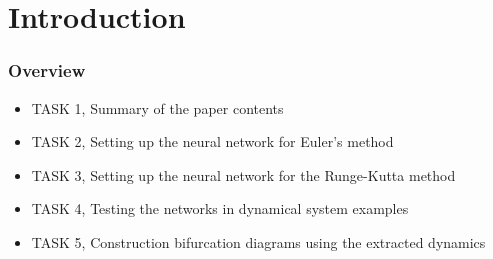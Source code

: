 \section{Introduction}

\begin{frame}
	\frametitle{Overview}
	\begin{itemize}
		\item TASK 1, Summary of the paper contents
		\item TASK 2, Setting up the neural network for Euler's method
		\item TASK 3, Setting up the neural network for the Runge-Kutta method
		\item TASK 4, Testing the networks in dynamical system examples
		\item TASK 5, Construction bifurcation diagrams using the extracted dynamics
	\end{itemize}
\end{frame}
